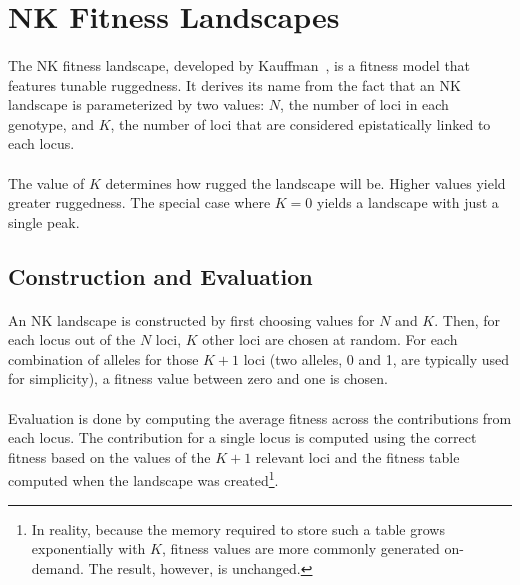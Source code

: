 \documentclass[12pt,letterpaper,titlepage]{article}
\begin{document}
\section{NK Fitness Landscapes}

\paragraph{}
The NK fitness landscape, developed by Kauffman~\cite{Kauffman1993}, is a
fitness model that features tunable ruggedness. It derives its name from the
fact that an NK landscape is parameterized by two values: $N$, the number of
loci in each genotype, and $K$, the number of loci that are considered
epistatically linked to each locus.

\paragraph{}
The value of $K$ determines how rugged the landscape will be. Higher values
yield greater ruggedness. The special case where $K=0$ yields a landscape with
just a single peak.

\subsection{Construction and Evaluation}

\paragraph{}
An NK landscape is constructed by first choosing values for $N$ and $K$. Then,
for each locus out of the $N$ loci, $K$ other loci are chosen at random. For
each combination of alleles for those $K+1$ loci (two alleles, 0 and 1, are
typically used for simplicity), a fitness value between zero and one is chosen.

\paragraph{}
Evaluation is done by computing the average fitness across the contributions
from each locus. The contribution for a single locus is computed using the
correct fitness based on the values of the $K+1$ relevant loci and the fitness
table computed when the landscape was created\footnote{In reality, because the
memory required to store such a table grows exponentially with $K$, fitness
values are more commonly generated on-demand. The result, however, is
unchanged.}.
\end{document}
